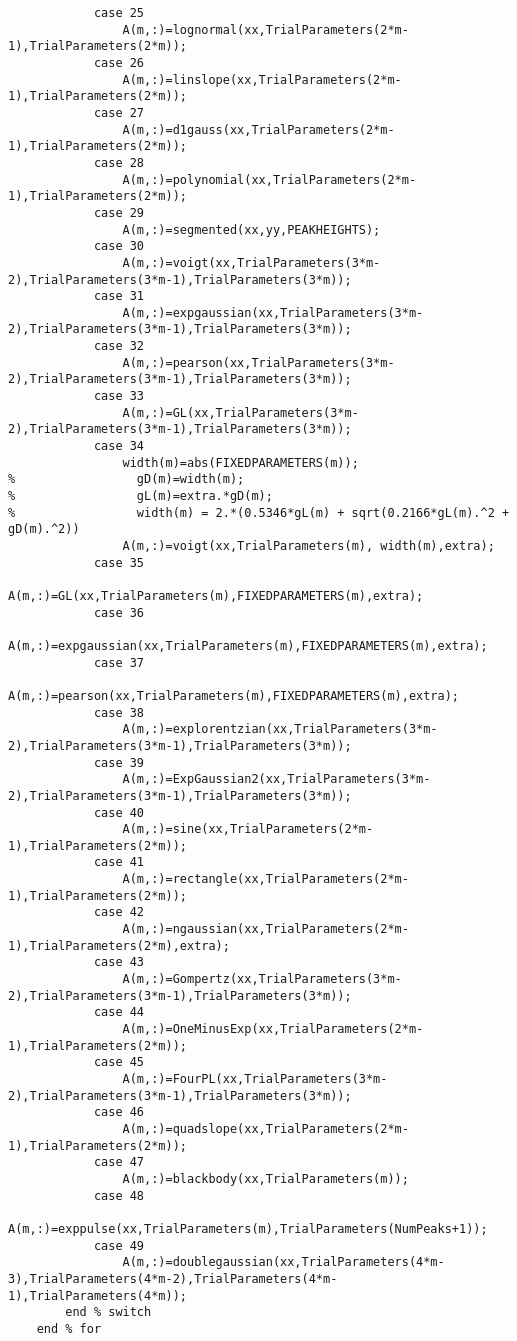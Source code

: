 \begin{lstlisting}
            case 25
                A(m,:)=lognormal(xx,TrialParameters(2*m-1),TrialParameters(2*m));
            case 26
                A(m,:)=linslope(xx,TrialParameters(2*m-1),TrialParameters(2*m));
            case 27
                A(m,:)=d1gauss(xx,TrialParameters(2*m-1),TrialParameters(2*m));       
            case 28
                A(m,:)=polynomial(xx,TrialParameters(2*m-1),TrialParameters(2*m));       
            case 29
                A(m,:)=segmented(xx,yy,PEAKHEIGHTS);
            case 30
                A(m,:)=voigt(xx,TrialParameters(3*m-2),TrialParameters(3*m-1),TrialParameters(3*m));        
            case 31
                A(m,:)=expgaussian(xx,TrialParameters(3*m-2),TrialParameters(3*m-1),TrialParameters(3*m));        
            case 32
                A(m,:)=pearson(xx,TrialParameters(3*m-2),TrialParameters(3*m-1),TrialParameters(3*m));        
            case 33
                A(m,:)=GL(xx,TrialParameters(3*m-2),TrialParameters(3*m-1),TrialParameters(3*m));
            case 34
                width(m)=abs(FIXEDPARAMETERS(m));
%                 gD(m)=width(m);
%                 gL(m)=extra.*gD(m);
%                 width(m) = 2.*(0.5346*gL(m) + sqrt(0.2166*gL(m).^2 + gD(m).^2))
                A(m,:)=voigt(xx,TrialParameters(m), width(m),extra);
            case 35
                A(m,:)=GL(xx,TrialParameters(m),FIXEDPARAMETERS(m),extra);
            case 36
                A(m,:)=expgaussian(xx,TrialParameters(m),FIXEDPARAMETERS(m),extra);
            case 37
                A(m,:)=pearson(xx,TrialParameters(m),FIXEDPARAMETERS(m),extra);
            case 38
                A(m,:)=explorentzian(xx,TrialParameters(3*m-2),TrialParameters(3*m-1),TrialParameters(3*m));                    
            case 39
                A(m,:)=ExpGaussian2(xx,TrialParameters(3*m-2),TrialParameters(3*m-1),TrialParameters(3*m));                               
            case 40
                A(m,:)=sine(xx,TrialParameters(2*m-1),TrialParameters(2*m));
            case 41
                A(m,:)=rectangle(xx,TrialParameters(2*m-1),TrialParameters(2*m));
            case 42
                A(m,:)=ngaussian(xx,TrialParameters(2*m-1),TrialParameters(2*m),extra);
            case 43
                A(m,:)=Gompertz(xx,TrialParameters(3*m-2),TrialParameters(3*m-1),TrialParameters(3*m));
            case 44
                A(m,:)=OneMinusExp(xx,TrialParameters(2*m-1),TrialParameters(2*m));
            case 45
                A(m,:)=FourPL(xx,TrialParameters(3*m-2),TrialParameters(3*m-1),TrialParameters(3*m));        
            case 46
                A(m,:)=quadslope(xx,TrialParameters(2*m-1),TrialParameters(2*m));
            case 47
                A(m,:)=blackbody(xx,TrialParameters(m));
            case 48
                A(m,:)=exppulse(xx,TrialParameters(m),TrialParameters(NumPeaks+1));
            case 49
                A(m,:)=doublegaussian(xx,TrialParameters(4*m-3),TrialParameters(4*m-2),TrialParameters(4*m-1),TrialParameters(4*m));
        end % switch
    end % for
    

\end{lstlisting}
